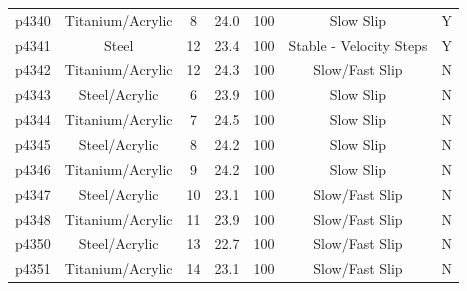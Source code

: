 \documentclass[11pt]{article}
\begin{document}
\begin{center}
\begin{table}
\begin{tabular}{ | c c c c c c c | }
p4340	     & Titanium/Acrylic & 8                   & 24.0            & 100                   & Slow Slip                       & Y              \\
p4341	     & Steel            & 12                  & 23.4            & 100                   & Stable - Velocity Steps         & Y              \\
p4342	     & Titanium/Acrylic & 12                  & 24.3            & 100                   & Slow/Fast Slip                  & N              \\
p4343	     & Steel/Acrylic    & 6                   & 23.9            & 100                   & Slow Slip                       & N              \\
p4344	     & Titanium/Acrylic & 7                   & 24.5            & 100                   & Slow Slip                       & N              \\
p4345	     & Steel/Acrylic    & 8                   & 24.2            & 100                   & Slow Slip                       & N              \\
p4346	     & Titanium/Acrylic & 9                   & 24.2            & 100                   & Slow Slip                       & N              \\
p4347	     & Steel/Acrylic    & 10                  & 23.1            & 100                   & Slow/Fast Slip                  & N              \\
p4348	     & Titanium/Acrylic & 11                  & 23.9            & 100                   & Slow/Fast Slip                  & N              \\
p4350	     & Steel/Acrylic    & 13                  & 22.7            & 100                   & Slow/Fast Slip                  & N              \\
p4351	     & Titanium/Acrylic & 14                  & 23.1            & 100                   & Slow/Fast Slip                  & N              \\


    \hline
    \end{tabular}
\end{table}
\end{center}
\end{document}
